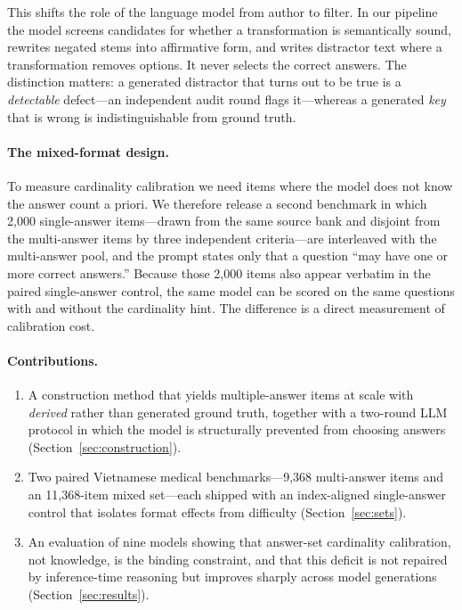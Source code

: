 \documentclass{article} %
\begin{document}
This shifts the role of the language model from author to filter. In our pipeline the
model screens candidates for whether a transformation is semantically sound, rewrites
negated stems into affirmative form, and writes distractor text where a transformation
removes options. It never selects the correct answers. The distinction matters: a
generated distractor that turns out to be true is a \emph{detectable} defect---an
independent audit round flags it---whereas a generated \emph{key} that is wrong is
indistinguishable from ground truth.

\paragraph{The mixed-format design.} To measure cardinality calibration we need items
where the model does not know the answer count a priori. We therefore release a second
benchmark in which 2,000 single-answer items---drawn from the same source bank and
disjoint from the multi-answer items by three independent criteria---are interleaved
with the multi-answer pool, and the prompt states only that a question ``may have one or
more correct answers.'' Because those 2,000 items also appear verbatim in the paired
single-answer control, the same model can be scored on the same questions with and
without the cardinality hint. The difference is a direct measurement of calibration cost.

\paragraph{Contributions.}
\begin{enumerate}
\item A construction method that yields multiple-answer items at scale with
      \emph{derived} rather than generated ground truth, together with a two-round LLM
      protocol in which the model is structurally prevented from choosing answers
      (Section~\ref{sec:construction}).
\item Two paired Vietnamese medical benchmarks---9,368 multi-answer items and an
      11,368-item mixed set---each shipped with an index-aligned single-answer control
      that isolates format effects from difficulty (Section~\ref{sec:sets}).
\item An evaluation of nine models showing that answer-set cardinality calibration, not
      knowledge, is the binding constraint, and that this deficit is not repaired by
      inference-time reasoning but improves sharply across model generations
      (Section~\ref{sec:results}).
\end{enumerate}
\end{document}
